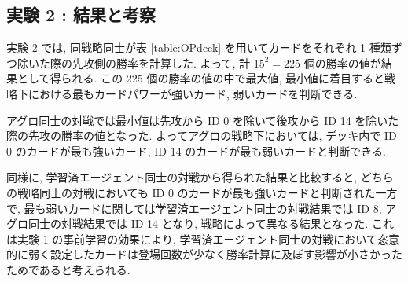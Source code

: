 \documentclass[twocolumn]{jarticle}
\begin{document}
         \subsection{実験 2 : 結果と考察}
         実験 2 では, 同戦略同士が表 \ref{table:OPdeck} を用いてカードをそれぞれ 1 種類ずつ除いた際の先攻側の勝率を計算した. よって, 計 $15^2 = 225$ 個の勝率の値が結果として得られる. この 225 個の勝率の値の中で最大値, 最小値に着目すると戦略下における最もカードパワーが強いカード, 弱いカードを判断できる.
         \par
         アグロ同士の対戦では最小値は先攻から ID 0 を除いて後攻から ID 14 を除いた際の先攻の勝率の値となった. よってアグロの戦略下においては, デッキ内で ID 0 のカードが最も強いカード, ID 14 のカードが最も弱いカードと判断できる. 
         \par
         同様に,  学習済エージェント同士の対戦から得られた結果と比較すると, どちらの戦略同士の対戦においても ID 0 のカードが最も強いカードと判断された一方で, 最も弱いカードに関しては学習済エージェント同士の対戦結果では ID 8, アグロ同士の対戦結果では ID 14 となり, 戦略によって異なる結果となった. これは実験 1 の事前学習の効果により, 学習済エージェント同士の対戦において恣意的に弱く設定したカードは登場回数が少なく勝率計算に及ぼす影響が小さかったためであると考えられる. 
      
\end{document}

